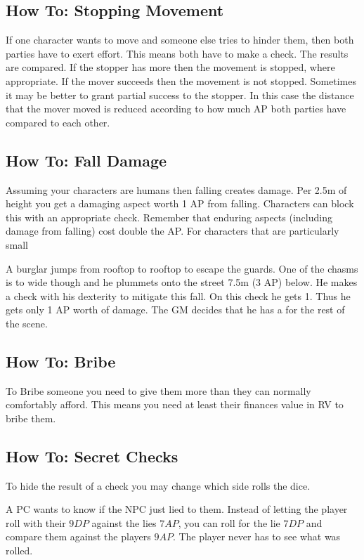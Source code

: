 \documentclass[11pt]{article}
\begin{document}
{\subsection{How To: Stopping Movement}
\label{sec:org1da3dd9}
If one character wants to move and someone else tries to hinder them, then both parties have to exert effort. This means both have to make a check. The results are compared. If the stopper has more then the movement is stopped, where appropriate. If the mover succeeds then the movement is not stopped. Sometimes it may be better to grant partial success to the stopper. In this case the distance that the mover moved is reduced according to how much AP both parties have compared to each other.
\subsection{How To: Fall Damage}
\label{sec:org0973b9b}
Assuming your characters are humans then falling creates damage. Per 2.5m of height you get a damaging aspect worth 1 AP from falling. Characters can block this with an appropriate check. Remember that enduring aspects (including damage from falling) cost double the AP.
For characters that are particularly small

\begin{pwexample}
A burglar jumps from rooftop to rooftop to escape the guards. One of the chasms is to wide though and he plummets onto the street 7.5m (3 AP) below. He makes a check with his dexterity to mitigate this fall. On this check he gets 1. Thus he gets only 1 AP worth of damage. The GM decides that he has a  for the rest of the scene.
\end{pwexample}
\subsection{How To: Bribe}
\label{sec:org0dcbcb1}
To Bribe someone you need to give them more than they can normally comfortably afford. This means you need at least their finances value in RV to bribe them.
\subsection{How To: Secret Checks}
\label{sec:orgf888df0}
To hide the result of a check you may change which side rolls the dice.

\begin{pwexample}
A PC wants to know if the NPC just lied to them. Instead of letting the player roll with their \(9 DP\) against the lies \(7 AP\), you can roll for the lie \(7 DP\) and compare them against the players \(9 AP\). The player never has to see what was rolled.
\end{pwexample}
}
\end{document}
